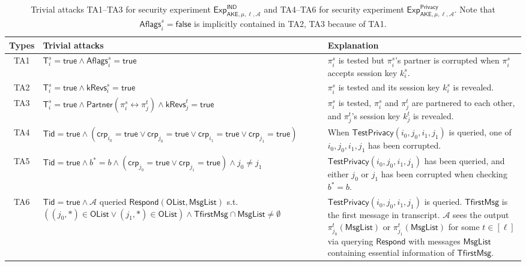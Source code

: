 \documentclass[a4paper,11pt]{article}
\begin{document}
\begin{sloppypar}
\begin{table}[htbp]
\centering
\caption{Trivial attacks TA1--TA3 for security experiment $\mathsf{Exp}^{\mathsf{IND}}_{\mathsf{AKE},\mu,\ell,\mathcal{A}}$ and TA4--TA6 for security experiment $\mathsf{Exp}^{\mathsf{Privacy}}_{\mathsf{AKE},\mu,\ell,\mathcal{A}}$. Note that $\mathsf{Aflags}^s_i = \mathsf{false}$ is implicitly contained in TA2, TA3 because of TA1.}
\label{tab:trivial-attacks}
\vspace{1em}
\begin{tabular}{|c|p{4.2cm}|p{6.8cm}|}
\hline
Types & Trivial attacks & Explanation \\
\hline
TA1 & 
$\mathsf{T}^s_i = \mathsf{true} \land \mathsf{Aflags}^s_i = \mathsf{true}$ & 
$\pi^s_i$ is tested but $\pi^s_i$'s partner is corrupted when $\pi^s_i$ accepts session key $k^s_i$. \\
\hline
TA2 & 
$\mathsf{T}^s_i = \mathsf{true} \land \mathsf{kRevs}^s_i = \mathsf{true}$ & 
$\pi^s_i$ is tested and its session key $k^s_i$ is revealed. \\
\hline
TA3 & 
$\mathsf{T}^s_i = \mathsf{true} \land \mathsf{Partner}(\pi^s_i \leftrightarrow \pi^t_j) \land \mathsf{kRevs}^t_j = \mathsf{true}$ & 
$\pi^s_i$ is tested, $\pi^s_i$ and $\pi^t_j$ are partnered to each other, and $\pi^t_j$'s session key $k^t_j$ is revealed. \\
\hline
TA4 & 
$\mathsf{Tid} = \mathsf{true} \land (\mathsf{crp}_{i_0} = \mathsf{true} \lor \mathsf{crp}_{j_0} = \mathsf{true} \lor \mathsf{crp}_{i_1} = \mathsf{true} \lor \mathsf{crp}_{j_1} = \mathsf{true})$ & 
When $\mathsf{TestPrivacy}(i_0, j_0, i_1, j_1)$ is queried, one of $i_0, j_0, i_1, j_1$ has been corrupted. \\
\hline
TA5 & 
$\mathsf{Tid} = \mathsf{true} \land b^* = b \land (\mathsf{crp}_{j_0} = \mathsf{true} \lor \mathsf{crp}_{j_1} = \mathsf{true}) \land j_0 \neq j_1$ & 
$\mathsf{TestPrivacy}(i_0, j_0, i_1, j_1)$ has been queried, and either $j_0$ or $j_1$ has been corrupted when checking $b^* = b$. \\
\hline
TA6 & 
$\mathsf{Tid} = \mathsf{true} \land \mathcal{A}$ queried $\mathsf{Respond}(\mathsf{OList}, \mathsf{MsgList})$ s.t. $((j_0, *) \in \mathsf{OList} \lor (j_1, *) \in \mathsf{OList}) \land \mathsf{TfirstMsg} \cap \mathsf{MsgList} \neq \emptyset$ & 
$\mathsf{TestPrivacy}(i_0, j_0, i_1, j_1)$ is queried. $\mathsf{TfirstMsg}$ is the first message in transcript. $\mathcal{A}$ sees the output $\pi^t_{j_0}(\mathsf{MsgList})$ or $\pi^t_{j_1}(\mathsf{MsgList})$ for some $t \in [\ell]$ via querying $\mathsf{Respond}$ with messages $\mathsf{MsgList}$ containing essential information of $\mathsf{TfirstMsg}$. \\
\hline
\end{tabular}
\end{table}


\end{sloppypar}
\end{document}
